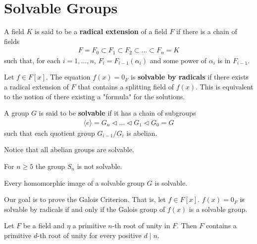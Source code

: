 \documentclass{memoir}
\begin{document}


\section{Solvable Groups}
\label{sec:solvable_groups}

\begin{defn}
	A field \(K\) is said to be a \textbf{radical extension} of a field \(F\) if there is a chain of fields
	\begin{align*}
		F = F_0 \subset F_1 \subset F_2 \subset \ldots\subset F_n = K
	\end{align*}
	such that, for each \(i=1,\ldots,n\), \(F_i = F_{i-1}(\alpha_i)\) and some power of \(\alpha_i\) is in \(F_{i-1}\).
\end{defn}
Let \(f \in F[x]\). The equation \(f(x) = 0_F\) is \textbf{solvable by radicals} if there exists a radical extension of \(F\) that contains a splitting field of \(f(x)\). This is equivalent to the notion of there existing a "formula" for the solutions.

\begin{defn}[Solvable]
	A group \(G\) is said to be \textbf{solvable} if it has a chain of subgroups
	\begin{align*}
		\langle e \rangle = G_n \triangleleft \ldots \triangleleft G_1 \triangleleft G_0 = G
	\end{align*}
	such that each quotient group \(G_{i-1} / G_i\) is abelian.
\end{defn}
Notice that all abelian groups are solvable.
\begin{prop}
	For \(n\geq 5\) the group \(S_n\) is not solvable.
\end{prop}
\begin{thm}
	Every homomorphic image of a solvable group \(G\) is solvable.
\end{thm}

Our goal is to prove the Galois Criterion. That is, let \(f \in F[x]\). \(f(x) = 0_F\) is solvable by radicals if and only if the Galois group of \(f(x)\) is a solvable group.

\begin{lemma}
	Let \(F\) be a field and \(\eta \) a primitive \(n\)-th root of unity in \(F\). Then \(F\) contains a primitive \(d\)-th root of unity for every positive \(d\mid n\).
\end{lemma}
\end{document}

